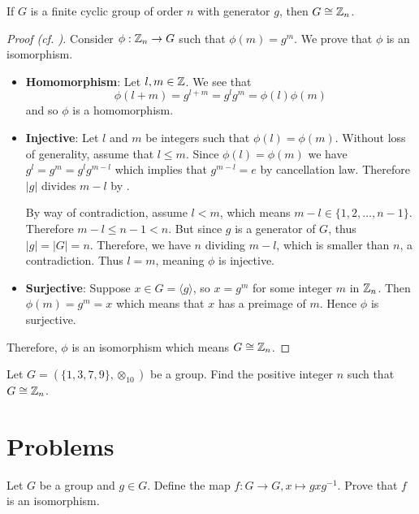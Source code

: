 \begin{theorem}\label{thrm-finite-cyclic-group-isomorphic-to-Zn}
    If $G$ is a finite cyclic group of order $n$ with generator $g$, then $G \cong \mathbb{Z}_n$.
\end{theorem}
\begin{proof}[Proof (cf. {\cite[\S 63]{clark_1984}})]
    Consider $\phi: \mathbb{Z}_n \to G$ such that $\phi(m) = g^m$. We prove that $\phi$ is an isomorphism.
    \begin{itemize}
        \item \textbf{Homomorphism}: Let $l,m \in \mathbb{Z}$. We see that
        \[
            \phi(l+m) = g^{l+m} = g^lg^m = \phi(l)\phi(m)
        \]
        and so $\phi$ is a homomorphism.

        \item \textbf{Injective}: Let $l$ and $m$ be integers such that $\phi(l) = \phi(m)$. Without loss of generality, assume that $l \leq m$. Since $\phi(l) = \phi(m)$ we have $g^l = g^m = g^lg^{m-l}$ which implies that $g^{m-l} = e$ by cancellation law. Therefore $|g|$ divides $m-l$ by .

        By way of contradiction, assume $l < m$, which means $m - l \in \{1, 2,\dots, n-1\}$. Therefore $m-l \leq n - 1 < n$. But since $g$ is a generator of $G$, thus $|g| = |G| = n$. Therefore, we have $n$ dividing $m-l$, which is smaller than $n$, a contradiction. Thus $l = m$, meaning $\phi$ is injective.

        \item \textbf{Surjective}: Suppose $x \in G = \langle g\rangle$, so $x = g^m$ for some integer $m$ in $\mathbb{Z}_n$. Then $\phi(m) = g^m = x$ which means that $x$ has a preimage of $m$. Hence $\phi$ is surjective.
    \end{itemize}

    Therefore, $\phi$ is an isomorphism which means $G \cong \mathbb{Z}_n$.
\end{proof}

\begin{exercise}
    Let $G = (\{1, 3, 7, 9\}, \otimes_{10})$ be a group. Find the positive integer $n$ such that $G \cong \mathbb{Z}_n$.
\end{exercise}

\newpage

\section{Problems}
\begin{problem}
    Let $G$ be a group and $g \in G$. Define the map $f: G \to G, x \mapsto gxg^{-1}$. Prove that $f$ is an isomorphism.
\end{problem}

